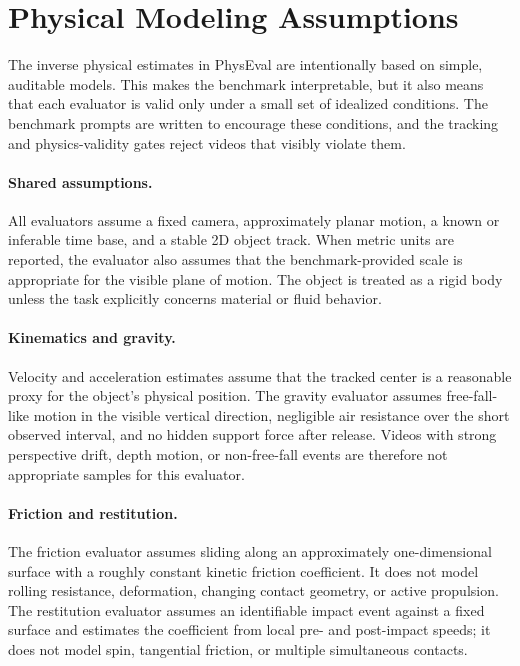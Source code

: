 \documentclass{article}
\newcommand{\bench}{PhysEval}
\begin{document}
{\small


}

\appendix

\section{Physical Modeling Assumptions}
\label{app:idealizations}

The inverse physical estimates in \bench{} are intentionally based on simple, auditable models.
This makes the benchmark interpretable, but it also means that each evaluator is valid only under a small set of idealized conditions.
The benchmark prompts are written to encourage these conditions, and the tracking and physics-validity gates reject videos that visibly violate them.

\paragraph{Shared assumptions.}
All evaluators assume a fixed camera, approximately planar motion, a known or inferable time base, and a stable 2D object track.
When metric units are reported, the evaluator also assumes that the benchmark-provided scale is appropriate for the visible plane of motion.
The object is treated as a rigid body unless the task explicitly concerns material or fluid behavior.

\paragraph{Kinematics and gravity.}
Velocity and acceleration estimates assume that the tracked center is a reasonable proxy for the object's physical position.
The gravity evaluator assumes free-fall-like motion in the visible vertical direction, negligible air resistance over the short observed interval, and no hidden support force after release.
Videos with strong perspective drift, depth motion, or non-free-fall events are therefore not appropriate samples for this evaluator.

\paragraph{Friction and restitution.}
The friction evaluator assumes sliding along an approximately one-dimensional surface with a roughly constant kinetic friction coefficient.
It does not model rolling resistance, deformation, changing contact geometry, or active propulsion.
The restitution evaluator assumes an identifiable impact event against a fixed surface and estimates the coefficient from local pre- and post-impact speeds; it does not model spin, tangential friction, or multiple simultaneous contacts.
\end{document}
